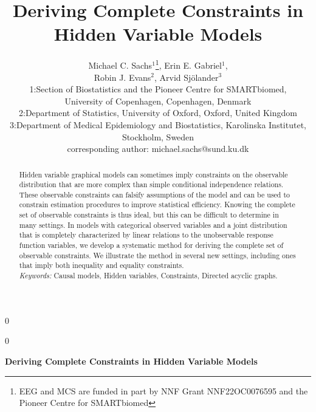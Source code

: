 \documentclass[12pt]{article}
\newcommand{\blind}{0}
\begin{document}
\blind
{
  \title{\bf Deriving Complete Constraints in Hidden Variable Models}
  \author{Michael C. Sachs$^1$\thanks{EEG and MCS are funded in part by NNF Grant NNF22OC0076595 and the Pioneer Centre for SMARTbiomed}, Erin E. Gabriel$^1$, \\
  Robin J. Evans$^2$,
  Arvid Sj\"olander$^3$\\  
\footnotesize 1:Section of Biostatistics and the Pioneer Centre for SMARTbiomed, \\ \footnotesize University of Copenhagen, Copenhagen, Denmark \\
\footnotesize 2:Department of Statistics, University of Oxford, Oxford, United Kingdom \\
\footnotesize 3:Department of Medical Epidemiology and Biostatistics, Karolinska Institutet, Stockholm, Sweden \\
\footnotesize corresponding author: michael.sachs@sund.ku.dk}
  \maketitle
} \fi 

\blind
{
  \bigskip
  \bigskip
  \bigskip
  \begin{center}
    {\LARGE\bf Deriving Complete Constraints in Hidden Variable Models}
\end{center}
  \medskip
} \fi

\bigskip


\begin{abstract}
Hidden variable graphical models can sometimes imply constraints on the observable distribution that are more complex than simple conditional independence relations. These observable constraints can falsify assumptions of the model and can be used to constrain estimation procedures to improve statistical efficiency. Knowing the complete set of observable constraints is thus ideal, but this can be difficult to determine in many settings.  In models with categorical observed variables and a joint distribution that is completely characterized by linear relations to the unobservable response function variables, we develop a systematic method for deriving the complete set of observable constraints. We illustrate the method in several new settings, including ones that imply both inequality and equality constraints. \\
\noindent \textit{Keywords:} Causal models, Hidden variables, Constraints, Directed acyclic graphs.
\end{abstract}
\end{document}
